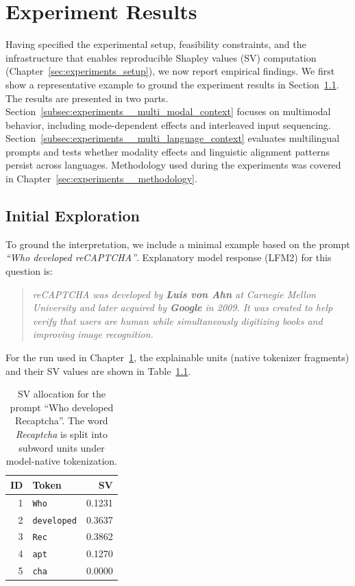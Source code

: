 \chapter{Experiment Results}
\label{sec:experiments_results}

Having specified the experimental setup, feasibility constraints, and the infrastructure that enables reproducible Shapley values (SV) computation (Chapter~\ref{sec:experiments_setup}), we now report empirical findings. We first show a representative example to ground the experiment results in Section~\ref{subsec:experiments__initial_exploration}. The results are presented in two parts. Section~\ref{subsec:experiments__multi_modal_context} focuses on multimodal behavior, including mode-dependent effects and interleaved input sequencing. Section~\ref{subsec:experiments__multi_language_context} evaluates multilingual prompts and tests whether modality effects and linguistic alignment patterns persist across languages. Methodology used during the experiments was covered in Chapter~\ref{sec:experiments__methodology}.

\section{Initial Exploration}
\label{subsec:experiments__initial_exploration}

To ground the interpretation, we include a minimal example based on the prompt \textit{``Who developed reCAPTCHA''}. Explanatory model response (LFM2) for this question is:

\begin{quote}
    \textit{reCAPTCHA was developed by \textbf{Luis von Ahn} at Carnegie Mellon University and later acquired by \textbf{Google} in 2009. It was created to help verify that users are human while simultaneously digitizing books and improving image recognition.}
\end{quote}

For the run used in Chapter~\ref{sec:experiments_results}, the explainable units (native tokenizer fragments) and their SV values are shown in Table~\ref{tab:experiments__sanity__recaptcha_tokens}.

\begin{table}[htbp]
\centering
\caption{SV allocation for the prompt ``Who developed Recaptcha''. The word \textit{Recaptcha} is split into subword units under model-native tokenization.}
\renewcommand{\arraystretch}{1.1}
\begin{tabular}{r l r}
\toprule
\textbf{ID} & \textbf{Token} & \textbf{SV} \\
\midrule
1 & \texttt{Who}       & 0.1231 \\
2 & \texttt{developed} & 0.3637 \\
3 & \texttt{Rec}       & 0.3862 \\
4 & \texttt{apt}       & 0.1270 \\
5 & \texttt{cha}       & 0.0000 \\
\bottomrule
\end{tabular}
\label{tab:experiments__sanity__recaptcha_tokens}
\end{table}

